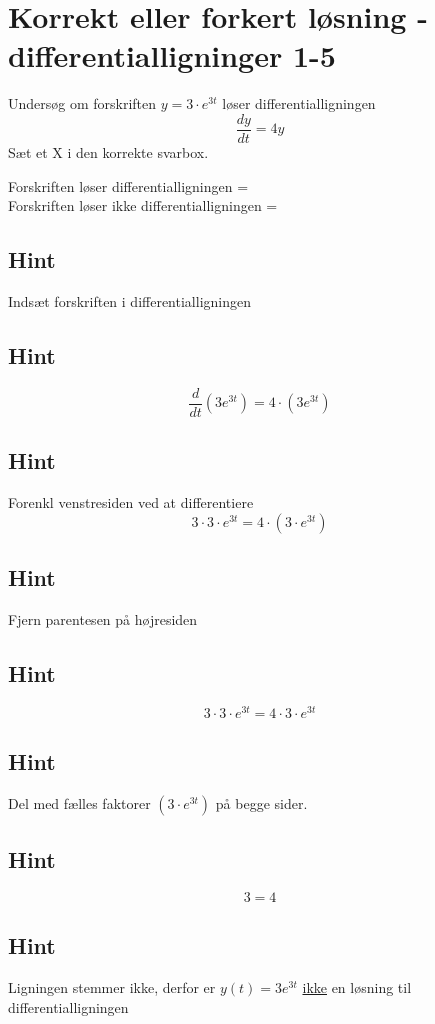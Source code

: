 \documentclass{article}
\newenvironment{exercise}[1]{\newpage\section{#1}}{}
\newcommand{\answerbox}[1]{\fbox{$#1$}}
\newcommand{\hint}{\subsection*{Hint}}
\begin{document}
\begin{exercise}{Korrekt eller forkert løsning - differentialligninger 1-5}
	
	
	Undersøg om forskriften $y = 3 \cdot e^{3t}$ løser differentialligningen
	\[
	\frac{dy}{dt} = 4y
	\]
	Sæt et X i den korrekte svarbox.
	
	Forskriften løser differentialligningen = \answerbox{} \\
	
	Forskriften løser ikke differentialligningen = \answerbox{X}
	
	\hint
	
	Indsæt forskriften i differentialligningen
	
	\hint
	\[
	\frac{d}{dt} \left( 3 e^{3t}\right) = 4 \cdot \left( 3 e^{3t} \right)
	\]
	
	
	\hint
	
	Forenkl venstresiden ved at differentiere
	\[
	3 \cdot 3 \cdot e^{3t} = 4 \cdot \left(3 \cdot e^{3t} \right)
	\]
	
	\hint
	
	Fjern parentesen på højresiden
	
	\hint
	\[
	3 \cdot 3 \cdot e^{3t} = 4 \cdot 3 \cdot e^{3t}
	\]
	
	\hint
	Del med fælles faktorer $\left( 3 \cdot e^{3t} \right)$ på begge sider.
	
	\hint
	
	\[
	3 = 4
	\]
	
	
	\hint
	
	Ligningen stemmer ikke, derfor er $y(t) = 3 e^{3t}$ \underline{ikke} en løsning til differentialligningen
	
\end{exercise}

\newpage
\end{document}
